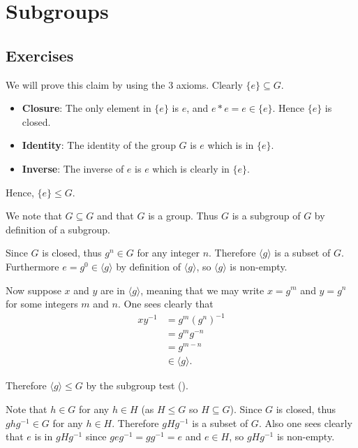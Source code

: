 \section{Subgroups}
\subsection*{Exercises}
\begin{questions}
    \item \begin{partquestions}{\alph*}
        \item We will prove this claim by using the 3 axioms. Clearly $\{e\} \subseteq G$.
        \begin{itemize}
            \item \textbf{Closure}: The only element in $\{e\}$ is $e$, and $e \ast e = e \in \{e\}$. Hence $\{e\}$ is closed.
            \item \textbf{Identity}: The identity of the group $G$ is $e$ which is in $\{e\}$.
            \item \textbf{Inverse}: The inverse of $e$ is $e$ which is clearly in $\{e\}$.
        \end{itemize}
        Hence, $\{e\} \leq G$.
        \item We note that $G \subseteq G$ and that $G$ is a group. Thus $G$ is a subgroup of $G$ by definition of a subgroup.
    \end{partquestions}

    \item Since $G$ is closed, thus $g^n \in G$ for any integer $n$. Therefore $\langle g \rangle$ is a subset of $G$. Furthermore $e = g^0 \in \langle g\rangle$ by definition of $\langle g\rangle$, so $\langle g \rangle$ is non-empty.

    Now suppose $x$ and $y$ are in $\langle g \rangle$, meaning that we may write $x = g^m$ and $y = g^n$ for some integers $m$ and $n$. One sees clearly that
    \begin{align*}
        xy^{-1} &= g^m\left(g^n\right)^{-1}\\
        &= g^mg^{-n}\\
        &= g^{m-n}\\
        &\in \langle g\rangle.
    \end{align*}

    Therefore $\langle g \rangle \leq G$ by the subgroup test ().

    \item Note that $h \in G$ for any $h \in H$ (as $H \leq G$ so $H \subseteq G$). Since $G$ is closed, thus $ghg^{-1} \in G$ for any $h \in H$. Therefore $gHg^{-1}$ is a subset of $G$. Also one sees clearly that $e$ is in $gHg^{-1}$ since $geg^{-1} = gg^{-1} = e$ and $e \in H$, so $gHg^{-1}$ is non-empty.


\end{questions}
